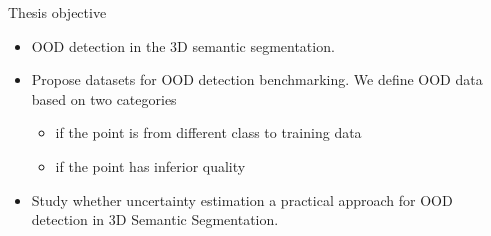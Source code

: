\documentclass[aspectratio=169]{beamer}
\begin{document}
\begin{frame}{Thesis objective}

\begin{itemize}
    \item OOD detection in the 3D semantic segmentation.
    \item Propose datasets for OOD detection benchmarking. We define OOD data based on two categories
    \begin{itemize}
        \item if the point is from different class to training data
        \item if the point has inferior quality
    \end{itemize}
    \item Study whether uncertainty estimation a practical approach for OOD detection in 3D Semantic Segmentation.
\end{itemize}
    
\end{frame}
\end{document}
